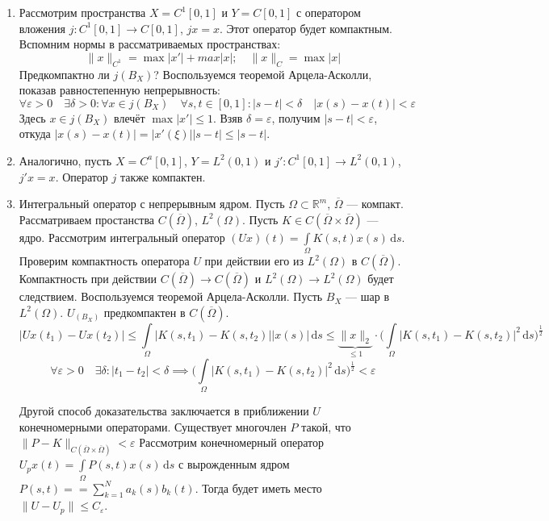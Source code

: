 \documentclass[11pt,openany,a4paper]{scrartcl}
\theoremstyle{plain}
\theoremstyle{definition}
\newcommand\mb{\mathbb}
\newcommand\real{\mb R}
\newcommand{\dif}{\, \mathrm d}
\newcommand\ol{\overline}
\begin{document}
\begin{enumerate}
    \item Рассмотрим пространства $X = C^1[0, 1]$ и $Y = C[0, 1]$ с оператором вложения
    $j: C^1[0, 1] \to C[0, 1]$, $jx = x$. Этот оператор будет компактным.
    Вспомним нормы в рассматриваемых пространствах:
    $$
    \|x\|_{C^1} = \max |x'| + max |x|;\quad \|x\|_C = \max |x|
    $$
    Предкомпактно ли $j(B_X)$? Воспользуемся теоремой Арцела-Асколли, показав равностепенную 
    непрерывность:
    $$
    \forall \varepsilon > 0\quad \exists \delta > 0 : \forall x \in j(B_X)\quad
    \forall s,t \in [0,1] : |s - t| < \delta\quad |x(s) - x(t)| < \varepsilon
    $$
    Здесь $x \in j(B_X)$ влечёт $\max |x'| \leqslant 1$. Взяв $\delta = \varepsilon$, получим
    $|s - t| < \varepsilon$, откуда $|x(s) - x(t)| = |x'(\xi)||s-t| \leqslant |s-t|$.
    
    \item Аналогично, пусть $X = C^a[0,1]$, $Y = L^2(0, 1)$ и $j' : C^1[0,1] \to L^2(0,1)$,
    $j'x = x$. Оператор $j$ также компактен.
    
    \item Интегральный оператор с непрерывным ядром.
    Пусть $\Omega \subset \real^m$, $\ol\Omega$ — компакт. Рассматриваем простанства
    $C(\ol\Omega)$, $L^2(\Omega)$. Пусть $K \in C(\ol \Omega \times \ol \Omega)$ — ядро. Рассмотрим
    интегральный оператор
    $(Ux)(t) = \int\limits_\Omega K(s, t) x(s) \dif s$. Проверим компактность оператора $U$
    при действии его из $L^2(\Omega)$ в $C(\ol \Omega)$. Компактность при действии
    $C(\ol \Omega) \to C(\ol \Omega)$ и $L^2(\Omega) \to L^2(\Omega)$ будет следствием.
    Воспользуемся теоремой Арцела-Асколли. Пусть $B_X$ — шар в $L^2(\Omega)$.
    $U_(B_X)$ предкомпактен в $C(\ol \Omega)$.
    $$
    |Ux(t_1) - Ux(t_2)| \leqslant \int\limits_\Omega |K(s, t_1) - K(s, t_2)||x(s)|\dif s \leqslant
    \underbrace{\|x\|_2}_{\leqslant 1} \cdot
    \bigg(\int\limits_\Omega |K(s, t_1) - K(s, t_2)|^2 \dif s\bigg)^{\frac{1}{2}}
    $$
    $$
    \forall \varepsilon > 0 \quad \exists \delta: |t_1 - t_2| < \delta \implies
    \bigg(\int\limits_\Omega |K(s, t_1) - K(s, t_2)|^2 \dif s\bigg)^{\frac{1}{2}} < \varepsilon
    $$
    
    Другой способ доказательства заключается в приближении $U$ конечномерными операторами.
    Существует многочлен $P$ такой, что $\|P - K\|_{C(\ol \Omega \times \ol \Omega)} < \varepsilon$
    Рассмотрим конечномерный оператор $U_px(t) = \int\limits_\Omega P(s, t) x(s) \dif s$ с 
    вырожденным ядром $P(s, t) = =\sum\limits_{k=1}^N a_k(s)b_k(t)$.
    Тогда будет иметь место $\|U - U_p\| \leqslant C_\varepsilon$.
    

\end{enumerate}
\end{document}
